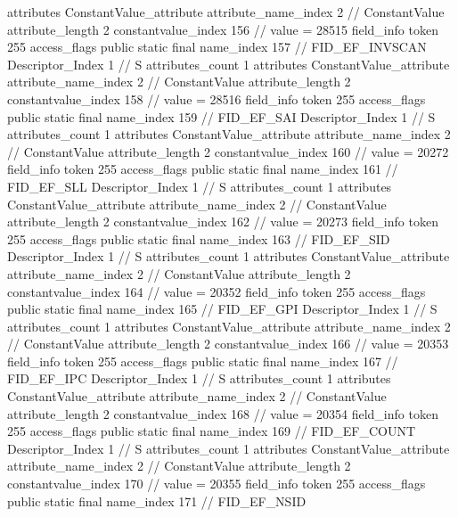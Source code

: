 {{{{{				attributes {
				ConstantValue_attribute {
					attribute_name_index	2		// ConstantValue
					attribute_length	2
					constantvalue_index	156		// value = 28515
				}
				}
			}
			field_info {
				token	255
				access_flags	public static final
				name_index	157		// FID_EF_INVSCAN
				Descriptor_Index	1		// S
				attributes_count	1
				attributes {
				ConstantValue_attribute {
					attribute_name_index	2		// ConstantValue
					attribute_length	2
					constantvalue_index	158		// value = 28516
				}
				}
			}
			field_info {
				token	255
				access_flags	public static final
				name_index	159		// FID_EF_SAI
				Descriptor_Index	1		// S
				attributes_count	1
				attributes {
				ConstantValue_attribute {
					attribute_name_index	2		// ConstantValue
					attribute_length	2
					constantvalue_index	160		// value = 20272
				}
				}
			}
			field_info {
				token	255
				access_flags	public static final
				name_index	161		// FID_EF_SLL
				Descriptor_Index	1		// S
				attributes_count	1
				attributes {
				ConstantValue_attribute {
					attribute_name_index	2		// ConstantValue
					attribute_length	2
					constantvalue_index	162		// value = 20273
				}
				}
			}
			field_info {
				token	255
				access_flags	public static final
				name_index	163		// FID_EF_SID
				Descriptor_Index	1		// S
				attributes_count	1
				attributes {
				ConstantValue_attribute {
					attribute_name_index	2		// ConstantValue
					attribute_length	2
					constantvalue_index	164		// value = 20352
				}
				}
			}
			field_info {
				token	255
				access_flags	public static final
				name_index	165		// FID_EF_GPI
				Descriptor_Index	1		// S
				attributes_count	1
				attributes {
				ConstantValue_attribute {
					attribute_name_index	2		// ConstantValue
					attribute_length	2
					constantvalue_index	166		// value = 20353
				}
				}
			}
			field_info {
				token	255
				access_flags	public static final
				name_index	167		// FID_EF_IPC
				Descriptor_Index	1		// S
				attributes_count	1
				attributes {
				ConstantValue_attribute {
					attribute_name_index	2		// ConstantValue
					attribute_length	2
					constantvalue_index	168		// value = 20354
				}
				}
			}
			field_info {
				token	255
				access_flags	public static final
				name_index	169		// FID_EF_COUNT
				Descriptor_Index	1		// S
				attributes_count	1
				attributes {
				ConstantValue_attribute {
					attribute_name_index	2		// ConstantValue
					attribute_length	2
					constantvalue_index	170		// value = 20355
				}
				}
			}
			field_info {
				token	255
				access_flags	public static final
				name_index	171		// FID_EF_NSID
}}}}}
